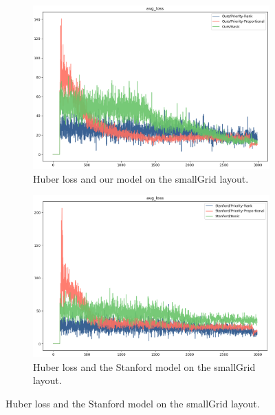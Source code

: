 \documentclass[conference]{IEEEtran}
\begin{document}
\begin{figure}
    \begin{subfigure}{.5\textwidth}
      \centering
      \includegraphics[width=.88\linewidth]{figures/small/training_smallgrid_huber_small.png}
      \caption{Huber loss and our model on the smallGrid layout.}
      \label{fig:train_our_huber}
    \end{subfigure}
    \begin{subfigure}{.5\textwidth}
      \centering
      \includegraphics[width=.88\linewidth]{figures/small/training_smallgrid_huber_stanford.png}
      \caption{Huber loss and the Stanford model on the smallGrid layout.}
      \label{fig:train_stanford_huber}
    \end{subfigure}
    \newline


\end{figure}
\end{document}
